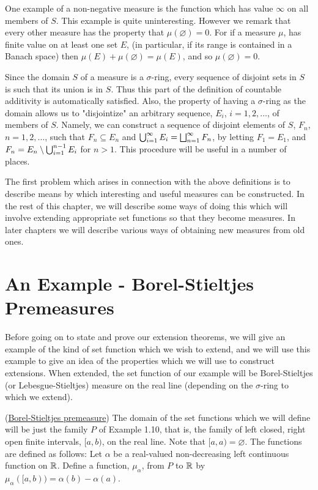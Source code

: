 One example of a non-negative measure is the function which has value $\infty$ on all members of $S$. This example is quite uninteresting. However we remark that every other measure has the property that $\mu(\varnothing)=0$. For if a measure $\mu$, has finite value on at least one set $E$, (in particular, if its range is contained in a Banach space) then $\mu(E)+\mu(\varnothing) = \mu(E)$, and so $\mu(\varnothing)=0$.

Since the domain $S$ of a measure is a $\sigma$-ring, every sequence of disjoint sets in $S$ is such that its union is in $S$. Thus this part of the definition of countable additivity is automatically satisfied. Also, the property of having a $\sigma$-ring as the domain allows us to "disjointize" an arbitrary sequence, $E_i$, $i = 1, 2,\dots$, of members of $S$. Namely, we can construct a sequence of disjoint elements of $S$, $F_n$, $n = 1, 2,\dots$, such that $F_n\subseteq E_n$ and $\bigcup_{i=1}^\infty E_i=\bigsqcup_{n=1}^\infty F_n$, by letting $F_1 = E_1$, and $F_n=E_n\setminus\bigcup_{i=1}^{n-1}E_i$ for $n > 1$. This procedure will be useful in a number of places.

The first problem which arises in connection with the above definitions is to describe means by which interesting and useful measures can be constructed. In the rest of this chapter, we will describe some ways of doing this which will involve extending appropriate set functions so that they become measures. In later chapters we will describe various ways of obtaining new measures from old ones.


\section{An Example - Borel-Stieltjes Premeasures}

Before going on to state and prove our extension theorems, we will give an example of the kind of set function which we wish to extend, and we will use this example to give an idea of the properties which we will use to construct extensions. When extended, the set function of our example will be Borel-Stieltjes (or Lebesgue-Stieltjes) measure on the real line (depending on the $\sigma$-ring to which we extend).

\begin{definition} (\underline{Borel-Stieltjes premeasure})
The domain of the set functions which we will define will be just the family $P$ of Example 1.10, that is, the family of left closed, right open finite intervals, $[a, b)$, on the real line. Note that $[a, a)=\varnothing $. The functions are defined as follows: Let $\alpha$ be a real-valued non-decreasing left continuous function on $\mathbb{R}$. Define a function, $\mu_\alpha$, from $P$ to $\mathbb{R}$ by $\mu_\alpha([a, b))=\alpha(b)-\alpha(a)$.
\end{definition}

